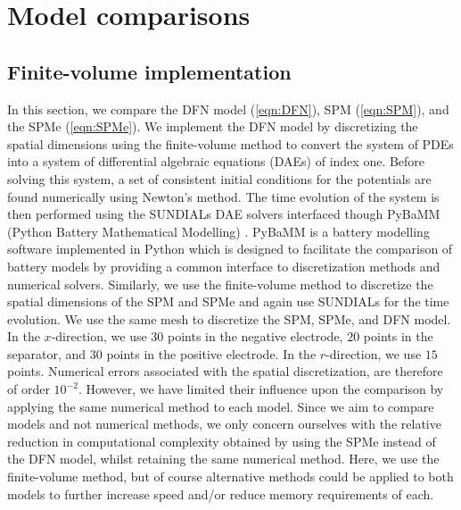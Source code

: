 \documentclass[a4paper]{article}
\begin{document}
\section{Model comparisons}\label{sec:SPM-SPMe-DFN}
\subsection{Finite-volume implementation}
In this section, we compare the DFN model (\ref{eqn:DFN}), SPM (\ref{eqn:SPM}), and the SPMe (\ref{eqn:SPMe}). We implement the DFN model by discretizing the spatial dimensions using the finite-volume method to convert the system of PDEs into a system of differential algebraic equations (DAEs) of index one. Before solving this system, a set of consistent initial conditions for the potentials are found numerically using Newton's method. The time evolution of the system is then performed using the SUNDIALs DAE solvers interfaced though PyBaMM (Python Battery Mathematical Modelling) \cite{sundials, pybamm}. PyBaMM is a battery modelling software implemented in Python which is designed to facilitate the comparison of battery models by providing a common interface to discretization methods and numerical solvers. Similarly, we use the finite-volume method to discretize the spatial dimensions of the SPM and SPMe and again use SUNDIALs for the time evolution. We use the same mesh to discretize the SPM, SPMe, and DFN model. In the $x$-direction, we use $30$ points in the negative electrode, $20$ points in the separator, and $30$ points in the positive electrode. In the $r$-direction, we use $15$ points. Numerical errors associated with the spatial discretization, are therefore of order $10^{-2}$. However, we have limited their influence upon the comparison by applying the same numerical method to each model. Since we aim to compare models and not numerical methods, we only concern ourselves with the relative reduction in computational complexity obtained by using the SPMe instead of the DFN model, whilst retaining the same numerical method. Here, we use the finite-volume method, but of course alternative methods could be applied to both models to further increase speed and/or reduce memory requirements of each. 
\end{document}
